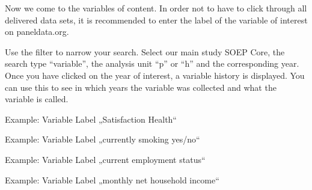 \documentclass[letterpaper,10pt,openany,onesideH,english]{sphinxmanual}
\begin{document}
%
\begin{sphinxVerbatim}[commandchars=\\\{\},numbers=left,firstnumber=1,stepnumber=1]

      
 
  

\end{sphinxVerbatim}

Now we come to the variables of content. In order not to have to click through all delivered data sets, it is recommended to enter the label of the variable of interest on paneldata.org.

Use the filter to narrow your search. Select our main study SOEP Core, the search type “variable”, the analysis unit “p” or “h” and the corresponding year. Once you have clicked on the year of interest, a variable history is displayed. You can use this to see in which years the variable was collected and what the variable is called.

Example: Variable Label „Satisfaction Health“

\begin{figure}[H]
\centering

\noindent{}
\end{figure}

Example: Variable  Label „currently smoking yes/no“

\begin{figure}[H]
\centering

\noindent{}
\end{figure}

Example: Variable  Label „current employment status“

\begin{figure}[H]
\centering

\noindent{}
\end{figure}

Example: Variable  Label „monthly net household income“
\end{document}
